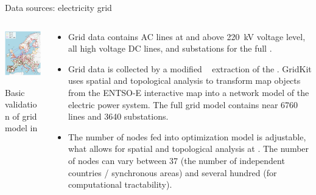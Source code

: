 \begin{frame}{Data sources: electricity grid}
 
  \begin{columns}[T]
  \begin{column}{6cm}

  \centering

  \includegraphics[width=6.5cm]{images/pypsa-eur-grid.png}

  {\footnotesize 
  \vspace{.1cm}
  Basic validation of grid model in 
  }
  \end{column}

  \begin{column}{9cm}
  {\small 
  \begin{itemize}
    \item Grid data contains AC lines at and above 220~kV voltage level, 
    all high voltage DC lines, and substations for the full 
    .
    \item Grid data is collected by a modified \faGithub~ extraction of the . GridKit uses spatial and topological analysis to transform map objects from the ENTSO-E interactive map into a network model of the electric power system. The full grid model contains near 6760 lines and 3640 substations. 
    \item The number of nodes fed into optimization model is adjustable, what allows for spatial and topological analysis at 
    . The number of nodes can vary between 37 (the number of independent countries / synchronous areas) and several hundred (for computational tractability).\\
  \end{itemize}
  }
  
  \end{column}
  \end{columns}

\end{frame}



